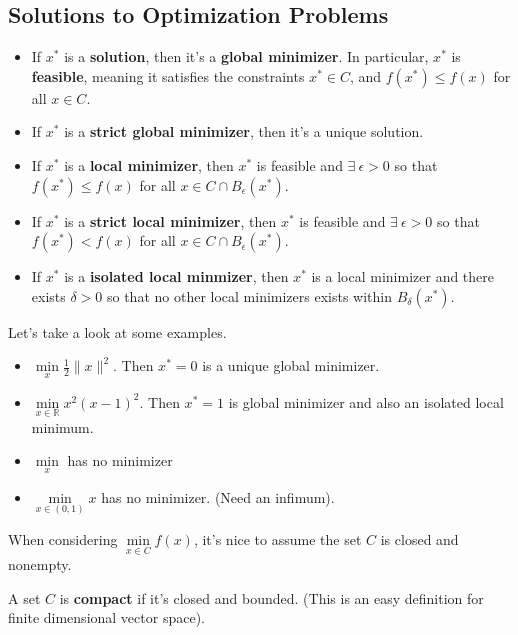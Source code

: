 \documentclass[english, 11pt]{article}
\begin{document}
\subsection{Solutions to Optimization Problems}
\begin{itemize}
\item If $x^*$ is a {\bf solution}, then it's a {\bf global minimizer}. In particular, $x^*$ is {\bf feasible}, meaning it satisfies the constraints $x^* \in C$, and $f(x^*) \le f(x)$ for all $x \in C$.
\item If $x^*$ is a {\bf strict global minimizer}, then it's a unique solution.
\item If $x^*$ is a {\bf local minimizer}, then $x^*$ is feasible and $\exists \ \epsilon>0$ so that $f(x^*) \le f(x)$ for all $x \in C \cap B_\epsilon(x^*)$.
\item If $x^*$ is a {\bf strict local minimizer},  then $x^*$ is feasible and $\exists \ \epsilon>0$ so that $f(x^*) < f(x)$ for all $x \in C \cap B_\epsilon(x^*)$.
\item If $x^*$ is a {\bf isolated local minmizer}, then $x^*$ is a local minimizer and there exists $\delta>0$ so that no other local minimizers exists within $B_\delta(x^*)$.
\end{itemize}

\begin{exmp} Let's take a look at some examples.

\begin{itemize}
\item $\min \limits_x \frac{1}{2} \|x\|^2$. Then $x^* =0$ is a unique global minimizer.
\item $\min \limits_{x \in \mathbb{R}} x^2(x-1)^2$. Then $x^* =1$ is global minimizer and also an isolated local minimum.
\item $\min \limits_{x}$ has no minimizer
\item $\min \limits_{x \in (0,1)} x$ has no minimizer. (Need an infimum).
\end{itemize}
\end{exmp}

\begin{rem}
When considering $\min \limits_{x \in C} f(x)$, it's nice to assume the set $C$ is closed and nonempty.
\end{rem}

\begin{defn}[Compact]
A set $C$ is {\bf compact} if it's closed and bounded. (This is an easy definition for finite dimensional vector space).
\end{defn}
\end{document}
